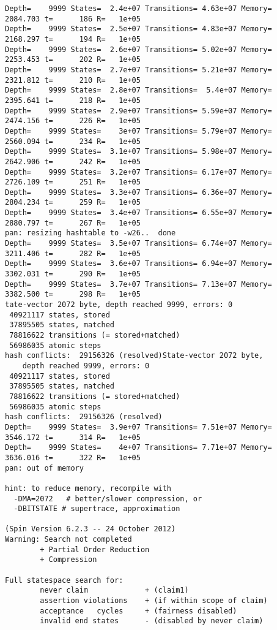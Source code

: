 \documentclass{llncs}
\begin{document}
\begin{lstlisting}[frame=single]
Depth=    9999 States=  2.4e+07 Transitions= 4.63e+07 Memory=  2084.703 t=      186 R=   1e+05
Depth=    9999 States=  2.5e+07 Transitions= 4.83e+07 Memory=  2168.297 t=      194 R=   1e+05
Depth=    9999 States=  2.6e+07 Transitions= 5.02e+07 Memory=  2253.453 t=      202 R=   1e+05
Depth=    9999 States=  2.7e+07 Transitions= 5.21e+07 Memory=  2321.812 t=      210 R=   1e+05
Depth=    9999 States=  2.8e+07 Transitions=  5.4e+07 Memory=  2395.641 t=      218 R=   1e+05
Depth=    9999 States=  2.9e+07 Transitions= 5.59e+07 Memory=  2474.156 t=      226 R=   1e+05
Depth=    9999 States=    3e+07 Transitions= 5.79e+07 Memory=  2560.094 t=      234 R=   1e+05
Depth=    9999 States=  3.1e+07 Transitions= 5.98e+07 Memory=  2642.906 t=      242 R=   1e+05
Depth=    9999 States=  3.2e+07 Transitions= 6.17e+07 Memory=  2726.109 t=      251 R=   1e+05
Depth=    9999 States=  3.3e+07 Transitions= 6.36e+07 Memory=  2804.234 t=      259 R=   1e+05
Depth=    9999 States=  3.4e+07 Transitions= 6.55e+07 Memory=  2880.797 t=      267 R=   1e+05
pan: resizing hashtable to -w26..  done
Depth=    9999 States=  3.5e+07 Transitions= 6.74e+07 Memory=  3211.406 t=      282 R=   1e+05
Depth=    9999 States=  3.6e+07 Transitions= 6.94e+07 Memory=  3302.031 t=      290 R=   1e+05
Depth=    9999 States=  3.7e+07 Transitions= 7.13e+07 Memory=  3382.500 t=      298 R=   1e+05
tate-vector 2072 byte, depth reached 9999, errors: 0
 40921117 states, stored
 37895505 states, matched
 78816622 transitions (= stored+matched)
 56986035 atomic steps
hash conflicts:  29156326 (resolved)State-vector 2072 byte, 
    depth reached 9999, errors: 0
 40921117 states, stored
 37895505 states, matched
 78816622 transitions (= stored+matched)
 56986035 atomic steps
hash conflicts:  29156326 (resolved)
Depth=    9999 States=  3.9e+07 Transitions= 7.51e+07 Memory=  3546.172 t=      314 R=   1e+05
Depth=    9999 States=    4e+07 Transitions= 7.71e+07 Memory=  3636.016 t=      322 R=   1e+05
pan: out of memory

hint: to reduce memory, recompile with
  -DMA=2072   # better/slower compression, or
  -DBITSTATE # supertrace, approximation

(Spin Version 6.2.3 -- 24 October 2012)
Warning: Search not completed
        + Partial Order Reduction
        + Compression

Full statespace search for:
        never claim             + (claim1)
        assertion violations    + (if within scope of claim)
        acceptance   cycles     + (fairness disabled)
        invalid end states      - (disabled by never claim)


\end{lstlisting}
\end{document}
